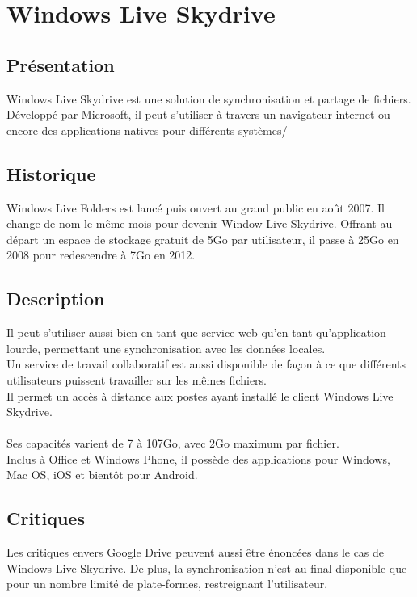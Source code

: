 \chapter{Windows Live Skydrive}
\thispagestyle{EIP} %

\section{Présentation}
Windows Live Skydrive est une solution de synchronisation et partage de fichiers. Développé par Microsoft, il peut s'utiliser à travers un navigateur internet ou encore des applications natives pour différents systèmes/

\section{Historique}
Windows Live Folders est lancé puis ouvert au grand public en août 2007. Il change de nom le même mois pour devenir Window Live Skydrive. Offrant au départ un espace de stockage gratuit de 5Go par utilisateur, il passe à 25Go en 2008 pour redescendre à 7Go en 2012.\\

\section{Description}
Il peut s'utiliser aussi bien en tant que service web qu'en tant qu'application lourde, permettant une synchronisation avec les données locales.\\
Un service de travail collaboratif est aussi disponible de façon à ce que différents utilisateurs puissent travailler sur les mêmes fichiers.\\
Il permet un accès à distance aux postes ayant installé le client Windows Live Skydrive.\\
\\
Ses capacités varient de 7 à 107Go, avec 2Go maximum par fichier.\\
Inclus à Office et Windows Phone, il possède des applications pour Windows, Mac OS, iOS et bientôt pour Android.\\

\section{Critiques}
Les critiques envers Google Drive peuvent aussi être énoncées dans le cas de Windows Live Skydrive. De plus, la synchronisation n'est au final disponible que pour un nombre limité de plate-formes, restreignant l'utilisateur.